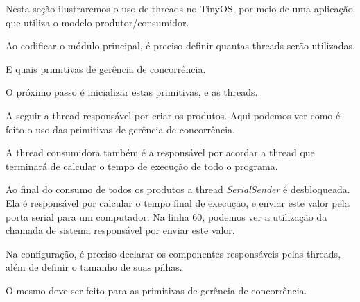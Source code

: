 Nesta seção ilustraremos o uso de threads no TinyOS, por meio de uma aplicação que utiliza o modelo produtor/consumidor.

Ao codificar o módulo principal, é preciso definir quantas threads serão utilizadas.

E quais primitivas de gerência de concorrência.


O próximo passo é inicializar estas primitivas, e as threads.


A seguir a thread responsável por criar os produtos. Aqui podemos ver como é feito o uso das primitivas de gerência de
concorrência.


A thread consumidora também é a responsável por acordar a thread que terminará de calcular o tempo de execução de todo o
programa.


Ao final do consumo de todos os produtos a thread \textit{SerialSender} é desbloqueada.
Ela é responsável por calcular o tempo final de execução, e enviar este valor pela porta serial para um computador.
Na linha 60, podemos ver a utilização da chamada de sistema responsável por enviar este valor.


Na configuração, é preciso declarar os componentes responsáveis pelas threads, além de definir o tamanho de suas pilhas.


O mesmo deve ser feito para as primitivas de gerência de concorrência.


